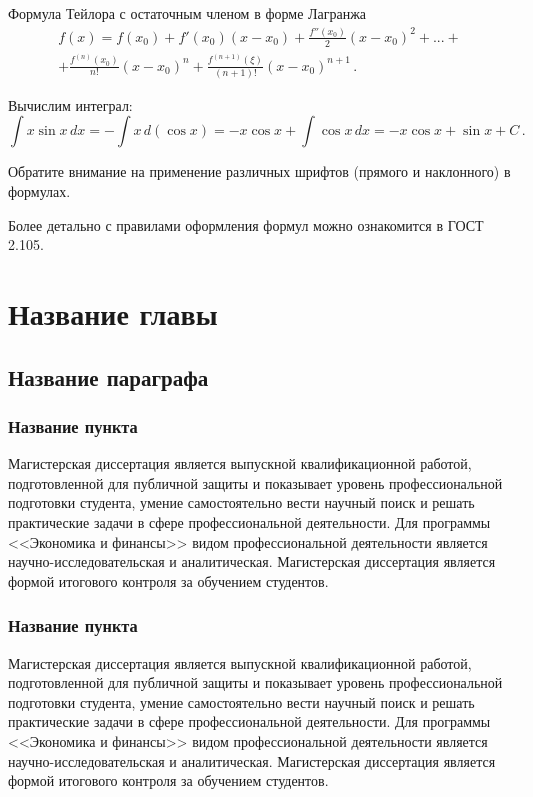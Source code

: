 \documentclass[12pt,a4paper, oneside]{extreport}
\begin{document}
Формула Тейлора с остаточным членом в форме Лагранжа
	\begin{multline}
		f(x)=f(x_{0} )+f'(x_{0} )(x-x_{0} )+\frac{f''(x_{0} )}{2} (x-x_{0} )^{2} +...+\\
		+\frac{f^{(n)} (x_{0} )}{n!} (x-x_{0} )^{n} +\frac{f^{(n+1)} (\xi )}{(n+1)!} (x-x_{0} )^{n+1}\,.  
	\end{multline}	

Вычислим интеграл:
\begin{equation*}
\int x\sin  x\,dx=
-\int x\, d\left(\cos  x \right)=
-x \cos  x+\int \cos  x\,dx=
-x \cos  x+\sin  x+C\,.
\end{equation*}

Обратите внимание на применение различных шрифтов (прямого и наклонного) в формулах.

Более детально с правилами оформления формул можно ознакомится в ГОСТ 2.105.


\chapter{Название главы}

\section{Название параграфа}

\subsection{Название пункта}

Магистерская диссертация является выпускной квалификационной работой, подготовленной для публичной защиты и показывает уровень профессиональной подготовки студента, умение самостоятельно вести научный поиск и решать практические задачи в сфере профессиональной деятельности. Для программы <<Экономика и финансы>> видом профессиональной деятельности является научно-исследовательская и аналитическая. Магистерская диссертация является формой итогового контроля за обучением студентов.

\subsection{Название пункта}

Магистерская диссертация является выпускной квалификационной работой, подготовленной для публичной защиты и показывает уровень профессиональной подготовки студента, умение самостоятельно вести научный поиск и решать практические задачи в сфере профессиональной деятельности. Для программы <<Экономика и финансы>> видом профессиональной деятельности является научно-исследовательская и аналитическая. Магистерская диссертация является формой итогового контроля за обучением студентов.
\end{document}
